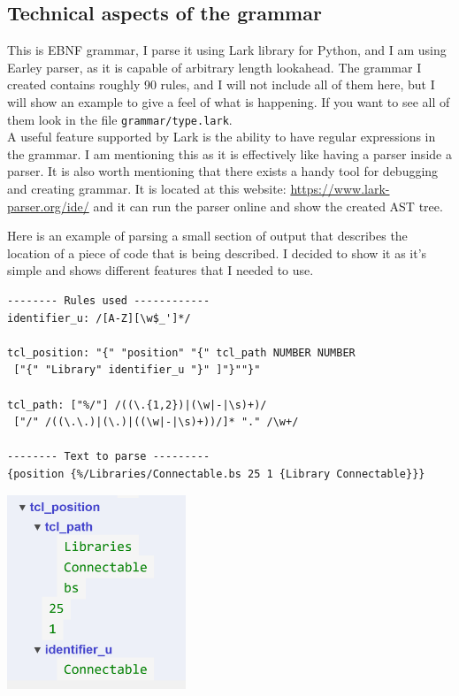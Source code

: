 \documentclass[12pt]{report}
\begin{document}
\subsection{Technical aspects of the grammar}
This is EBNF grammar, I parse it using Lark library for Python, and I am using Earley parser, as it is capable of arbitrary length lookahead. The grammar I created contains roughly 90 rules, and I will not include all of them here, but I will show an example to give a feel of what is happening. If you want to see all of them look in the file \verb!grammar/type.lark!.
\\   
A useful feature supported by Lark is the ability to have regular expressions in the grammar. I am mentioning this as it is effectively like having a parser inside a parser. It is also worth mentioning that there exists a handy tool for debugging and creating grammar. It is located at this website: \href{https://www.lark-parser.org/ide/}{https://www.lark-parser.org/ide/} and it can run the parser online and show the created AST tree. 
\begin{tcolorbox}[title = Example of a paring rule and the resulting AST]
Here is an example of parsing a small section of output that describes the location of a piece of code that is being described. I decided to show it as it's simple and shows different features that I needed to use.
    \begin{verbatim}
-------- Rules used ------------
identifier_u: /[A-Z][\w$_']*/

tcl_position: "{" "position" "{" tcl_path NUMBER NUMBER 
 ["{" "Library" identifier_u "}" ]"}""}"

tcl_path: ["%/"] /((\.{1,2})|(\w|-|\s)+)/ 
 ["/" /((\.\.)|(\.)|((\w|-|\s)+))/]* "." /\w+/

-------- Text to parse ---------
{position {%/Libraries/Connectable.bs 25 1 {Library Connectable}}}
    \end{verbatim}
    \includegraphics[width=0.4\textwidth]{images/TCLPath.png}
\end{tcolorbox}
\end{document}
